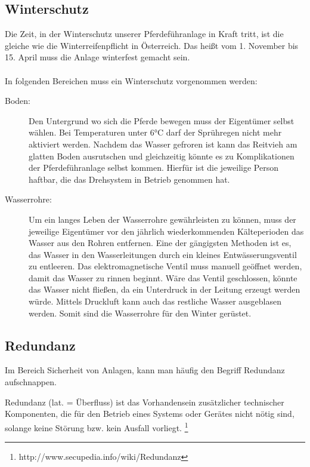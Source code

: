 \documentclass[12pt]{scrreprt} %
\begin{document}
\subsection{Winterschutz}
\label{sec:winterschutz}

Die Zeit, in der Winterschutz unserer Pferdeführanlage in Kraft tritt, ist die gleiche wie die Winterreifenpflicht in Österreich. Das heißt vom 1. November bis 15. April muss die Anlage winterfest gemacht sein. 
\\
\\
In folgenden Bereichen muss ein Winterschutz vorgenommen werden:
\begin{description}
\item[Boden:]
Den Untergrund wo sich die Pferde bewegen muss der Eigentümer selbst wählen. Bei Temperaturen unter 6°C darf der Sprühregen nicht mehr aktiviert werden. Nachdem das Wasser gefroren ist kann das Reitvieh am glatten Boden ausrutschen und gleichzeitig könnte es zu Komplikationen der Pferdeführanlage selbst kommen. Hierfür ist die jeweilige Person haftbar, die das Drehsystem in Betrieb genommen hat.

\item[Wasserrohre:]

Um ein langes Leben der Wasserrohre gewährleisten zu können, muss der jeweilige Eigentümer vor den jährlich wiederkommenden Kälteperioden das Wasser aus den Rohren entfernen. Eine der gängigsten Methoden ist es, das Wasser in den Wasserleitungen durch ein kleines Entwässerungsventil zu entleeren. Das elektromagnetische Ventil muss manuell geöffnet werden, damit das Wasser zu rinnen beginnt. Wäre das Ventil geschlossen, könnte das Wasser nicht fließen, da ein Unterdruck in der Leitung erzeugt werden würde. Mittels Druckluft kann auch das restliche Wasser ausgeblasen werden. Somit sind die Wasserrohre für den Winter gerüstet.

\end{description}

\subsection{Redundanz}
\label{sec:redundanz}

Im Bereich Sicherheit von Anlagen, kann man häufig den Begriff Redundanz aufschnappen. 

 Redundanz (lat. = Überfluss) ist das Vorhandensein zusätzlicher technischer Komponenten, die für den Betrieb eines Systems oder Gerätes nicht nötig sind, solange keine Störung bzw. kein Ausfall vorliegt. \footnote{http://www.secupedia.info/wiki/Redundanz}
\end{document}
